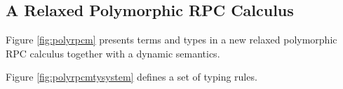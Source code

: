 \documentclass[a4paper]{article}
\theoremstyle{plain}
\theoremstyle{definition}
\begin{document}

\subsection{A Relaxed Polymorphic RPC Calculus}

%
Figure \ref{fig:polyrpcm} presents terms and types in a new relaxed
polymorphic RPC calculus together with a dynamic semantics.

%
Figure \ref{fig:polyrpcmtysystem} defines a set of typing rules.






\end{document}
